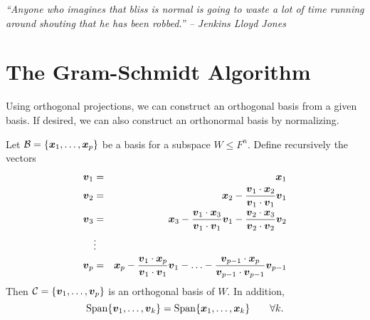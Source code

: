 \begin{center} 
\emph{``Anyone who imagines that bliss is normal is going to waste a lot of time running around shouting that he has been robbed.'' -- Jenkins Lloyd Jones}
\end{center}

\section{The Gram-Schmidt Algorithm}\label{sec:gram}
Using orthogonal projections, we can construct an orthogonal basis from a given basis. If desired, we can also construct an orthonormal basis by normalizing.\\

\begin{Thm}
Let $\mathcal{B}=\{\boldsymbol x_1, \ldots, \boldsymbol x_p\}$ be a basis for a subspace $W\le F^n$. Define recursively the vectors
\begin{eqnarray*}
\boldsymbol v_1 &=& \boldsymbol x_1\\
\boldsymbol v_2 &=& \boldsymbol x_2 - \dfrac{\boldsymbol v_1\cdot \boldsymbol x_2}{ \boldsymbol v_1\cdot \boldsymbol v_1}\boldsymbol v_1\\
\boldsymbol v_3 &=& \boldsymbol x_3 - \dfrac{\boldsymbol v_1\cdot \boldsymbol x_3}{\boldsymbol v_1\cdot \boldsymbol v_1}\boldsymbol v_1 - \dfrac{\boldsymbol v_2\cdot \boldsymbol x_3}{\boldsymbol v_2\cdot \boldsymbol v_2}\boldsymbol v_2\\
&\vdots&\\
\boldsymbol v_p &=& \boldsymbol x_p - \dfrac{\boldsymbol v_1\cdot \boldsymbol x_p}{\boldsymbol v_1\cdot \boldsymbol v_1}\boldsymbol v_1 - \ldots - \dfrac{\boldsymbol v_{p-1}\cdot \boldsymbol x_p}{\boldsymbol v_{p-1}\cdot \boldsymbol v_{p-1}}\boldsymbol v_{p-1}
\end{eqnarray*} Then $\mathcal{C} = \{\boldsymbol v_1, \ldots, \boldsymbol v_p\}$ is an orthogonal basis of $W$. In addition, 
\[\operatorname{Span}\{\boldsymbol v_1, \ldots, \boldsymbol v_k\} = \operatorname{Span}\{\boldsymbol x_1,\ldots, \boldsymbol x_k\}\qquad \forall k.\]
\end{Thm}\vs

